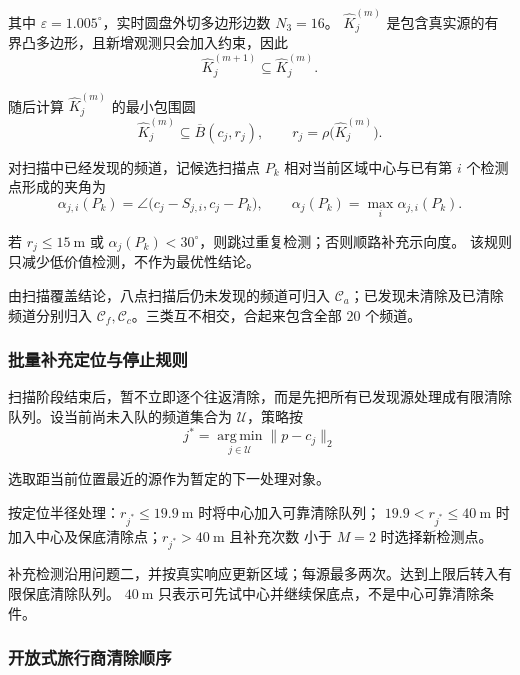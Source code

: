 其中 $\varepsilon=1.005^\circ$，实时圆盘外切多边形边数 $N_3=16$。
$\widehat K_j^{(m)}$ 是包含真实源的有界凸多边形，且新增观测只会加入约束，因此
\begin{equation}
  \widehat K_j^{(m+1)}\subseteq\widehat K_j^{(m)}.
  \label{eq:q3-nested-regions}
\end{equation}

随后计算 $\widehat K_j^{(m)}$ 的最小包围圆
\begin{equation}
  \widehat K_j^{(m)}\subseteq\overline B(c_j,r_j),
  \qquad r_j=\rho\bigl(\widehat K_j^{(m)}\bigr).
  \label{eq:q3-mec}
\end{equation}

对扫描中已经发现的频道，记候选扫描点 $P_k$ 相对当前区域中心与已有第 $i$ 个检测点形成的夹角为
\begin{equation}
  \alpha_{j,i}(P_k)
  =\angle\bigl(c_j-S_{j,i},c_j-P_k\bigr),
  \qquad
  \alpha_j(P_k)=\max_i\alpha_{j,i}(P_k).
\end{equation}

若 $r_j\leq15\ \mathrm{m}$ 或 $\alpha_j(P_k)<30^\circ$，则跳过重复检测；否则顺路补充示向度。
该规则只减少低价值检测，不作为最优性结论。

由扫描覆盖结论，八点扫描后仍未发现的频道可归入 $\mathcal C_a$；已发现未清除及已清除频道分别归入 $\mathcal C_f,\mathcal C_c$。三类互不相交，合起来包含全部 $20$ 个频道。

\subsubsection{批量补充定位与停止规则}

扫描阶段结束后，暂不立即逐个往返清除，而是先把所有已发现源处理成有限清除队列。设当前尚未入队的频道集合为 $\mathcal U$，策略按
\begin{equation}
  j^*=\operatorname*{arg\,min}_{j\in\mathcal U}\|p-c_j\|_2
  \label{eq:q3-nearest-source}
\end{equation}

选取距当前位置最近的源作为暂定的下一处理对象。

按定位半径处理：$r_{j^*}\leq19.9\ \mathrm m$ 时将中心加入可靠清除队列；
$19.9<r_{j^*}\leq40\ \mathrm m$ 时加入中心及保底清除点；$r_{j^*}>40\ \mathrm m$ 且补充次数
小于 $M=2$ 时选择新检测点。

补充检测沿用问题二，并按真实响应更新区域；每源最多两次。达到上限后转入有限保底清除队列。
$40\ \mathrm{m}$ 只表示可先试中心并继续保底点，不是中心可靠清除条件。

\subsubsection{开放式旅行商清除顺序}

